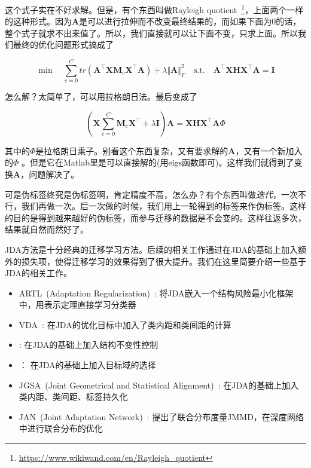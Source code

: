 这个式子实在不好求解。但是，有个东西叫做Rayleigh quotient~\footnote{\url{https://www.wikiwand.com/en/Rayleigh_quotient}}，上面两个一样的这种形式。因为$\mathbf{A}$是可以进行拉伸而不改变最终结果的，而如果下面为0的话，整个式子就求不出来值了。所以，我们直接就可以让下面不变，只求上面。所以我们最终的优化问题形式搞成了

\begin{equation}
	\min \quad \sum_{c=0}^{C}tr(\mathbf{A}^\top \mathbf{X} \mathbf{M}_c \mathbf{X}^\top \mathbf{A}) + \lambda \Vert \mathbf{A} \Vert ^2_F \quad \text{s.t.} \quad \mathbf{A}^\top \mathbf{X} \mathbf{H} \mathbf{X}^\top \mathbf{A} = \mathbf{I}
\end{equation}

怎么解？太简单了，可以用拉格朗日法。最后变成了

\begin{equation}
	\left(\mathbf{X} \sum_{c=0}^{C} \mathbf{M}_c \mathbf{X}^\top + \lambda \mathbf{I}\right) \mathbf{A} =\mathbf{X} \mathbf{H} \mathbf{X}^\top \mathbf{A} \Phi 
\end{equation}

其中的$\Phi$是拉格朗日乘子。别看这个东西复杂，又有要求解的$\mathbf{A}$，又有一个新加入的$\Phi$ 。但是它在Matlab里是可以直接解的(用$\mathrm{eigs}$函数即可)。这样我们就得到了变换$\mathbf{A}$，问题解决了。

可是伪标签终究是伪标签啊，肯定精度不高，怎么办？有个东西叫做\textit{迭代}，一次不行，我们再做一次。后一次做的时候，我们用上一轮得到的标签来作伪标签。这样的目的是得到越来越好的伪标签，而参与迁移的数据是不会变的。这样往返多次，结果就自然而然好了。

JDA方法是十分经典的迁移学习方法。后续的相关工作通过在JDA的基础上加入额外的损失项，使得迁移学习的效果得到了很大提升。我们在这里简要介绍一些基于JDA的相关工作。

\begin{itemize}
	\item ARTL~(Adaptation Regularization)~\cite{long2014adaptation}: 将JDA嵌入一个结构风险最小化框架中，用表示定理直接学习分类器
	\item VDA~\cite{tahmoresnezhad2016visual}: 在JDA的优化目标中加入了类内距和类间距的计算
	\item \cite{hsiao2016learning}: 在JDA的基础上加入结构不变性控制
	\item \cite{hou2015unsupervised}： 在JDA的基础上加入目标域的选择
	\item JGSA~(Joint Geometrical and Statistical Alignment)~\cite{zhang2017joint}: 在JDA的基础上加入类内距、类间距、标签持久化
	\item JAN~(Joint Adaptation Network)~\cite{long2017deep}: 提出了联合分布度量JMMD，在深度网络中进行联合分布的优化
\end{itemize}

